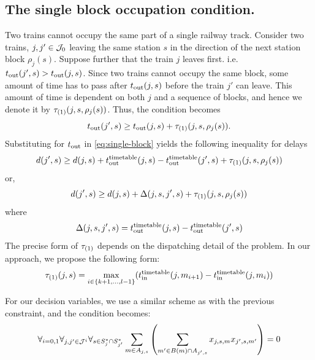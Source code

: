 \subsection{The single block occupation condition.}
Two trains cannot occupy the same part of a single railway track. Consider two
trains, $j, j' \in \mathcal{J}_0$ leaving the same station $s$ in the direction of the
next station block $\rho_j(s)$. Suppose further that the train $j$ leaves
first. i.e. $t_\text{out}(j', s) > t_\text{out}(j, s)$. Since two trains cannot occupy the
same block, some amount of time has to pass after $t_\text{out}(j, s)$ before the
train $j'$ can leave. This amount of time is dependent on both $j$ and a
sequence of blocks, and hence we denote it by $\tau_{(1)}(j, s, \rho_j(s))$. Thus,
the condition becomes
\begin{equation}
  \label{eq:single-block}
  t_\text{out}(j', s) \ge t_\text{out}(j, s) + \tau_{(1)}(j, s, \rho_j(s)).
\end{equation}
Substituting for $t_\text{out}$ in \eqref{eq:single-block} yields the following
inequality for delays
\begin{equation}
  \label{eq:single-block-delays}
  d(j', s) \ge d(j, s) + t_\text{out}^\text{timetable}(j, s) - t_\text{out}^\text{timetable}(j', s) + \tau_{(1)}(j, s, \rho_j(s))
\end{equation}
or,
\begin{equation}
  d(j', s) \ge d(j, s) + \Delta(j, s, j', s) + \tau_{(1)}(j, s, \rho_j(s))
\end{equation}
where
\begin{equation}
  \label{eq:delta}
  \Delta(j, s, j', s) = t_\text{out}^\text{timetable}(j, s) - t_\text{out}^\text{timetable}(j', s)
\end{equation}
The precise form of $\tau_{(1)}$ depends on the dispatching detail of the problem.
In our approach, we propose the following form:
\begin{equation}
  \tau_{(1)}(j, s) = \max_{i \in \{k+1,\ldots,l-1\}}(t_\text{in}^\text{timetable}(j, m_{i+1}) - t_\text{in}^\text{timetable}(j, m_i))
\end{equation}

For our decision variables, we use a similar scheme as with the previous
constraint, and the condition becomes:
\begin{equation}
  \label{eq:qubo:singleblock}
  \forall_{i=0,1} \forall_{j, j' \in \mathcal{J}^{i}} \forall_{s \in S^{*}_{j} \cap S^{*}_{j'}} \sum_{m \in A_{j, s}} \left(
  \sum_{m' \in B(m) \cap A_{j', s}} x_{j,s,m}x_{j',s,m'}
  \right) = 0
\end{equation}
